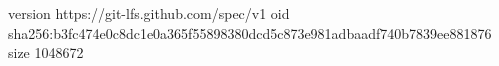 version https://git-lfs.github.com/spec/v1
oid sha256:b3fc474e0c8dc1e0a365f55898380dcd5c873e981adbaadf740b7839ee881876
size 1048672
